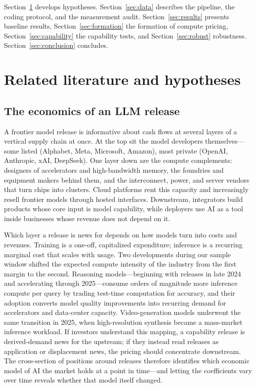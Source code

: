 \documentclass[review,12pt,authoryear]{elsarticle}
\begin{document}
Section~\ref{sec:lit} develops hypotheses. Section~\ref{sec:data} describes
the pipeline, the coding protocol, and the measurement audit.
Section~\ref{sec:results} presents baseline results,
Section~\ref{sec:formation} the formation of compute pricing,
Section~\ref{sec:capability} the capability tests, and
Section~\ref{sec:robust} robustness. Section~\ref{sec:conclusion} concludes.

\section{Related literature and hypotheses}\label{sec:lit}

\subsection{The economics of an LLM release}

A frontier model release is informative about cash flows at several layers of
a vertical supply chain at once. At the top sit the model developers
themselves---some listed (Alphabet, Meta, Microsoft, Amazon), most private
(OpenAI, Anthropic, xAI, DeepSeek). One layer down are the compute
complements: designers of accelerators and high-bandwidth memory, the
foundries and equipment makers behind them, and the interconnect, power, and
server vendors that turn chips into clusters. Cloud platforms rent this
capacity and increasingly resell frontier models through hosted interfaces.
Downstream, integrators build products whose core input is model capability,
while deployers use AI as a tool inside businesses whose revenue does not
depend on it.

Which layer a release is news for depends on how models turn into costs and
revenues. Training is a one-off, capitalized expenditure; inference is a
recurring marginal cost that scales with usage. Two developments during our
sample window shifted the expected compute intensity of the industry from
the first margin to the second. Reasoning models---beginning with releases
in late 2024 and accelerating through 2025---consume orders of magnitude
more inference compute per query by trading test-time computation for
accuracy, and their adoption converts model quality improvements into
recurring demand for accelerators and data-center capacity. Video-generation
models underwent the same transition in 2025, when high-resolution synthesis
became a mass-market inference workload. If investors understand this
mapping, a capability release is derived-demand news for the upstream; if
they instead read releases as application or displacement news, the pricing
should concentrate downstream. The cross-section of positions around
releases therefore identifies which economic model of AI the market holds
at a point in time---and letting the coefficients vary over time reveals
whether that model itself changed.
\end{document}
